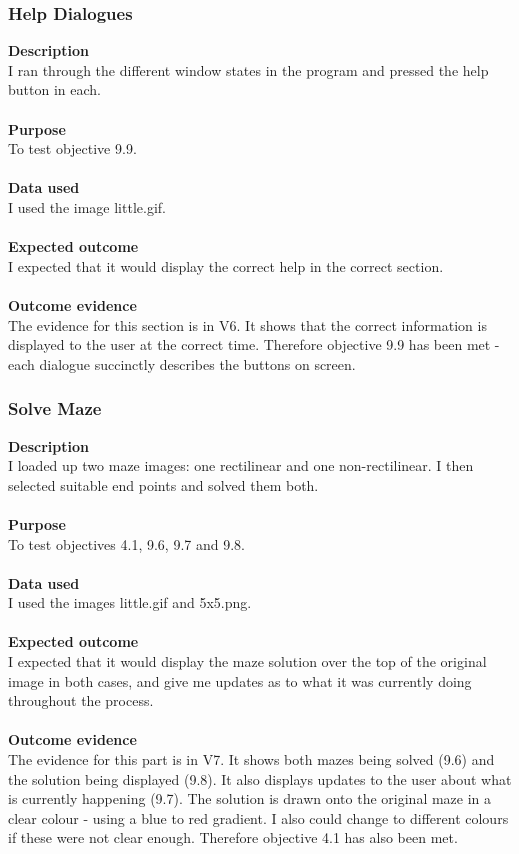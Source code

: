 \documentclass[titlepage]{article}
\begin{document}
\subsubsection{Help Dialogues}
\textbf{Description}\\
I ran through the different window states in the program and pressed the help button in each.\\\\
\textbf{Purpose}\\
To test objective 9.9. \\\\
\textbf{Data used} \\
I used the image little.gif.\\\\
\textbf{Expected outcome}\\
I expected that it would display the correct help in the correct section.\\\\
\textbf{Outcome evidence}\\
The evidence for this section is in V6. It shows that the correct information is displayed to the user at the correct time. Therefore objective 9.9 has been met - each dialogue succinctly describes the buttons on screen. 

\subsubsection{Solve Maze}
\textbf{Description}\\
I loaded up two maze images: one rectilinear and one non-rectilinear. I then selected suitable end points and solved them both. \\\\
\textbf{Purpose}\\
To test objectives 4.1, 9.6, 9.7 and 9.8. \\\\
\textbf{Data used} \\
I used the images little.gif and 5x5.png.\\\\
\textbf{Expected outcome}\\
I expected that it would display the maze solution over the top of the original image in both cases, and give me updates as to what it was currently doing throughout the process.\\\\
\textbf{Outcome evidence}\\
The evidence for this part is in V7. It shows both mazes being solved (9.6) and the solution being displayed (9.8). It also displays updates to the user about what is currently happening (9.7). The solution is drawn onto the original maze in a clear colour - using a blue to red gradient. I also could change to different colours if these were not clear enough. Therefore objective 4.1 has also been met. 
\end{document}
